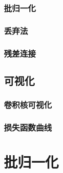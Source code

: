 \documentclass{article}
\begin{document}
\subsubsection{批归一化}

\subsubsection{丢弃法}

\subsubsection{残差连接}

\subsection{可视化}

\subsubsection{卷积核可视化}

\subsubsection{损失函数曲线}

\section{批归一化}
	
\end{document}
